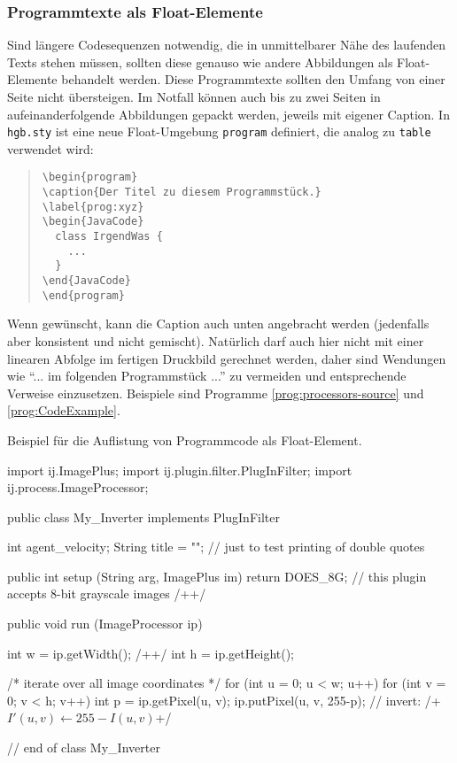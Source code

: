 \subsubsection{Programmtexte als Float-Elemente}
Sind längere Codesequenzen notwendig, die in unmittelbarer Nähe des laufenden Texts
stehen müssen, sollten diese genauso wie andere Abbildungen als Float-Elemente
behandelt werden. Diese Programmtexte sollten den Umfang von einer Seite nicht übersteigen.
Im Notfall können auch bis zu zwei Seiten in aufeinanderfolgende Abbildungen gepackt werden,
jeweils mit eigener Caption. In \texttt{hgb.sty} ist eine neue Float-Umgebung \texttt{program} definiert, die analog zu \texttt{table} verwendet wird:
%
\begin{quote}
\begin{verbatim}
\begin{program}
\caption{Der Titel zu diesem Programmstück.}
\label{prog:xyz}
\begin{JavaCode}
  class IrgendWas {
    ...
  }
\end{JavaCode}
\end{program}
\end{verbatim}
\end{quote}
%
Wenn gewünscht, kann die Caption auch unten angebracht werden 
(jedenfalls aber konsistent und nicht gemischt).
Natürlich darf auch hier nicht mit einer linearen Abfolge im fertigen
Druckbild gerechnet werden, daher sind Wendungen wie
"`... im  folgenden Programmstück ..."' zu vermeiden und entsprechende Verweise
einzusetzen. Beispiele sind Programme \ref{prog:processors-source} und \ref{prog:CodeExample}.

\begin{program}
\caption{Beispiel für die Auflistung von Programmcode als Float-Element.}
\label{prog:CodeExample}
\begin{JavaCode}
import ij.ImagePlus;
import ij.plugin.filter.PlugInFilter;
import ij.process.ImageProcessor;

public class My_Inverter implements PlugInFilter {
	int agent_velocity;
  String title = ""; // just to test printing of double quotes

	public int setup (String arg, ImagePlus im) {
		return DOES_8G;	// this plugin accepts 8-bit grayscale images /+\label{pr:IjSamplePlugin10}+/
	}

	public void run (ImageProcessor ip) {
		int w = ip.getWidth();	/+\label{ExampleCodeLabel}+/
		int h = ip.getHeight(); 
		
		/* iterate over all image coordinates */
		for (int u = 0; u < w; u++) { 
			for (int v = 0; v < h; v++) {
				int p = ip.getPixel(u, v); 
				ip.putPixel(u, v, 255-p); // invert: /+$I'(u,v) \leftarrow 255 - I(u,v)$\label{MathInCode}+/
			}
		}
	}		
} // end of class My_Inverter
\end{JavaCode}
%
\end{program}


